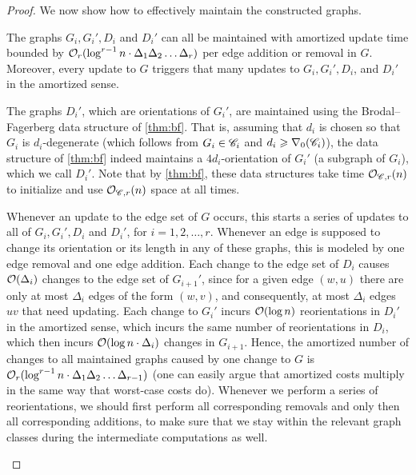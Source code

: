 \begin{proof}
%	
%	
%	
	
	
	We now show how to effectively maintain the constructed graphs.
	
	\begin{claim}\label{cl:maintain}
		The graphs $G_i, G_i', D_i$ and $D_i'$ can all be maintained
		with amortized update time bounded by $\mathcal{O}_r(\log^{r-1}n \cdot \Delta_1 \Delta_2 \ldots \Delta_r)$ per edge addition or removal in $G$. Moreover, every update to $G$ triggers that many updates to $G_i, G_i', D_i$, and $D_i'$ in the amortized sense.
	\end{claim}
	
	\begin{claimproof}
		The graphs $D_i'$, which are orientations of $G_i'$, are maintained using the Brodal--Fagerberg data structure of \cref{thm:bf}. That is, assuming that $d_i$ is chosen so that $G_i$ is $d_i$-degenerate (which follows from $G_i\in \mathscr C_i$ and $d_i\geqslant \nabla_0(\mathscr C_i)$), the data structure of \cref{thm:bf} indeed maintains a $4d_i$-orientation of $G_i'$ (a subgraph of $G_i$), which we call $D_i'$. Note that by \cref{thm:bf}, these data structures take time $\mathcal{O}_{\mathscr C,r}(n)$ to initialize and use $\mathcal{O}_{\mathscr C,r}(n)$ space at all times.
		
		Whenever an update to the edge set of $G$ occurs, this starts a series of updates to all of $G_i, G_i', D_i$ and $D_i'$, for $i=1,2,\ldots,r$. Whenever an edge is supposed to change its orientation or its length in any of these graphs, this is modeled by one edge removal and one edge addition. Each change to the edge set of $D_i$ causes $\mathcal{O}(\Delta_i)$ changes to the edge set of $G_{i+1}'$, since for a given edge $(w, u)$ there are only at most $\Delta_i$ edges of the form $(w, v)$, and consequently, at most $\Delta_i$ edges $uv$ that need updating.
		Each change to $G_i'$ incurs $\mathcal{O}(\log n)$ reorientations in $D_i'$ in the amortized sense, which incurs the same number of reorientations in $D_i$, which then incurs $\mathcal{O}(\log n \cdot \Delta_i)$ changes in $G_{i+1}$. Hence, the amortized number of changes to all maintained graphs caused by one change to $G$ is $\mathcal{O}_r(\log^{r-1} n \cdot \Delta_1 \Delta_2 \ldots \Delta_{r-1})$ (one can easily argue that amortized costs multiply in the same way that worst-case costs do). Whenever we perform a series of reorientations, we should first perform all corresponding removals and only then all corresponding additions, to make sure that we stay within the relevant graph classes during the intermediate computations as well.
		

\end{claimproof}
\end{proof}

